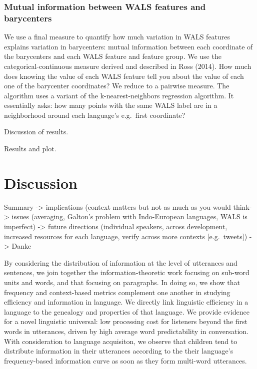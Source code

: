 \documentclass[
  english,
  man,floatsintext]{apa6}
\begin{document}
\hypertarget{mutual-information-between-wals-features-and-barycenters}{%
\subsubsection{Mutual information between WALS features and barycenters}\label{mutual-information-between-wals-features-and-barycenters}}

We use a final measure to quantify how much variation in WALS features explains variation in barycenters: mutual information between each coordinate of the barycenters and each WALS feature and feature group. We use the categorical-continuous measure derived and described in Ross (2014). How much does knowing the value of each WALS feature tell you about the value of each one of the barycenter coordinates? We reduce to a pairwise measure. The algorithm uses a variant of the k-nearest-neighbors regression algorithm. It essentially asks: how many points with the same WALS label are in a neighborhood around each language's e.g.~first coordinate?

Discussion of results.

Results and plot.

\hypertarget{discussion}{%
\section{Discussion}\label{discussion}}

Summary -\textgreater{} implications (context matters but not as much as you would think-\textgreater{} issues (averaging, Galton's problem with Indo-European languages, WALS is imperfect) -\textgreater{} future directions (individual speakers, across development, increased resources for each language, verify across more contexts {[}e.g.~tweets{]}) -\textgreater{} Danke

By considering the distribution of information at the level of utterances and sentences, we join together the information-theoretic work focusing on sub-word units and words, and that focusing on paragraphs. In doing so, we show that frequency and context-based metrics complement one another in studying efficiency and information in language. We directly link linguistic efficiency in a language to the genealogy and properties of that language. We provide evidence for a novel linguistic universal: low processing cost for listeners beyond the first words in utterances, driven by high average word predictability in conversation. With consideration to language acquisiton, we observe that children tend to distribute information in their utterances according to the their language's frequency-based information curve as soon as they form multi-word utterances.
\end{document}
